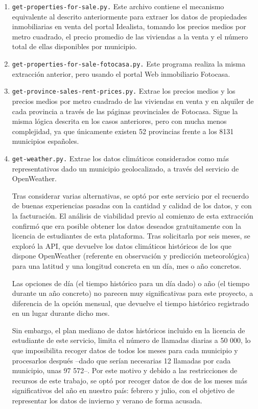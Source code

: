 \begin{enumerate}
    \item \texttt{get-properties-for-sale.py.} Este archivo contiene el mecanismo equivalente al descrito anteriormente para extraer los datos de propiedades inmobiliarias en venta del portal Idealista, tomando los precios medios por metro cuadrado, el precio promedio de las viviendas a la venta y el número total de ellas disponibles por municipio.

    \item \texttt{get-properties-for-sale-fotocasa.py.} Este programa realiza la misma extracción anterior, pero usando el portal Web inmobiliario Fotocasa.

    \item \texttt{get-province-sales-rent-prices.py.} Extrae los precios medios y los precios medios por metro cuadrado de las viviendas en venta y en alquiler de cada provincia a través de las páginas provinciales de Fotocasa. Sigue la misma lógica descrita en los casos anteriores, pero con mucha menos complejidad, ya que únicamente existen 52 provincias frente a los 8131 municipios españoles.

    \item \texttt{get-weather.py.} Extrae los datos climáticos considerados como más representativos dado un municipio geolocalizado, a través del servicio de OpenWeather.

    Tras considerar varias alternativas, se optó por este servicio por el recuerdo de buenas experiencias pasadas con la cantidad y calidad de los datos, y con la facturación. El análisis de viabilidad previo al comienzo de esta extracción confirmó que era posible obtener los datos deseados gratuitamente con la licencia de estudiantes de esta plataforma. Tras solicitarla por seis meses, se exploró la API, que devuelve los datos climáticos históricos de los que dispone OpenWeather (referente en  observación y predicción meteorológica) para una latitud y una longitud concreta en un día, mes o año concretos.
    
    Las opciones de día (el tiempo histórico para un día dado) o año (el tiempo durante un año concreto) no parecen muy significativas para este proyecto, a diferencia de la opción mensual, que devuelve el tiempo histórico registrado en un lugar durante dicho mes.
    
    Sin embargo, el plan mediano de datos históricos incluido en la licencia de estudiante de este servicio, limita el número de llamadas diarias a 50 000, lo que imposibilita recoger datos de todos los meses para cada municipio y procesarlos después –dado que serían necesarias 12 llamadas por cada municipio, unas 97 572–. Por este motivo y debido a las restricciones de recursos de este trabajo, se optó por recoger datos de dos de los meses más significativos del año en nuestro país: febrero y julio, con el objetivo de representar los datos de invierno y verano de forma acusada.    
    

\end{enumerate}
